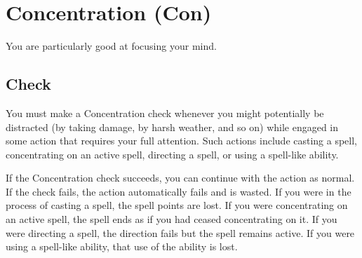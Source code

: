 
\section[Concentration]{Concentration (Con)}
\label{sec:Concentration}
You are particularly good at focusing your mind.
\subsection{Check}
You must make a Concentration check whenever you might potentially be distracted (by taking damage, by harsh weather, and so on) 
while engaged in some action that requires your full attention. 
Such actions include casting a spell, concentrating on an active spell, directing a spell, or using a spell-like ability.

If the Concentration check succeeds, you can continue with the action as normal. 
If the check fails, the action automatically fails and is wasted. 
If you were in the process of casting a spell, the spell points are lost. 
If you were concentrating on an active spell, the spell ends as if you had ceased concentrating on it. 
If you were directing a spell, the direction fails but the spell remains active. 
If you were using a spell-like ability, that use of the ability is lost.

